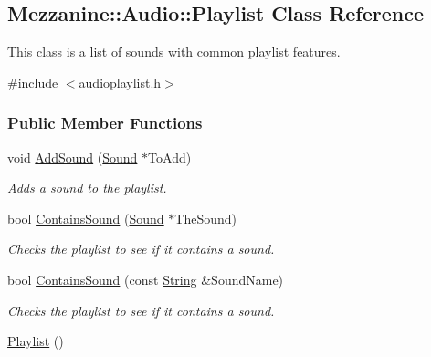 \hypertarget{classMezzanine_1_1Audio_1_1Playlist}{
\subsection{Mezzanine::Audio::Playlist Class Reference}
\label{classMezzanine_1_1Audio_1_1Playlist}
}


This class is a list of sounds with common playlist features.  




{\ttfamily \#include $<$audioplaylist.h$>$}

\subsubsection*{Public Member Functions}
\begin{DoxyCompactItemize}
\item 
void \hyperlink{classMezzanine_1_1Audio_1_1Playlist_a574b7a451eab384a77a0e114b8664c72}{AddSound} (\hyperlink{classMezzanine_1_1Audio_1_1Sound}{Sound} $\ast$ToAdd)
\begin{DoxyCompactList}\small\item\em Adds a sound to the playlist. \item\end{DoxyCompactList}\item 
bool \hyperlink{classMezzanine_1_1Audio_1_1Playlist_a319f906c569d851da502e52fae43cc9d}{ContainsSound} (\hyperlink{classMezzanine_1_1Audio_1_1Sound}{Sound} $\ast$TheSound)
\begin{DoxyCompactList}\small\item\em Checks the playlist to see if it contains a sound. \item\end{DoxyCompactList}\item 
bool \hyperlink{classMezzanine_1_1Audio_1_1Playlist_afa6086153b55cdcfed29baaad5566da1}{ContainsSound} (const \hyperlink{namespaceMezzanine_acf9fcc130e6ebf08e3d8491aebcf1c86}{String} \&SoundName)
\begin{DoxyCompactList}\small\item\em Checks the playlist to see if it contains a sound. \item\end{DoxyCompactList}\item 
\hypertarget{classMezzanine_1_1Audio_1_1Playlist_a55f449c891d5e9197b8d305309561c75}{
\hyperlink{classMezzanine_1_1Audio_1_1Playlist_a55f449c891d5e9197b8d305309561c75}{Playlist} ()}
\label{classMezzanine_1_1Audio_1_1Playlist_a55f449c891d5e9197b8d305309561c75}


\end{DoxyCompactItemize}
